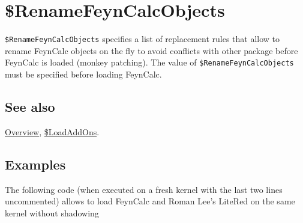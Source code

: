 \documentclass[../FeynCalcManual.tex]{subfiles}
\begin{document}
\hypertarget{dollarrenamefeyncalcobjects}{
\section{\$RenameFeynCalcObjects}\label{dollarrenamefeyncalcobjects}}

\texttt{\$RenameFeynCalcObjects} specifies a list of replacement rules
that allow to rename FeynCalc objects on the fly to avoid conflicts with
other package before FeynCalc is loaded (monkey patching). The value of
\texttt{\$RenameFeynCalcObjects} must be specified before loading
FeynCalc.

\subsection{See also}

\hyperlink{toc}{Overview}, \hyperlink{dollarloadaddons}{\$LoadAddOns}.

\subsection{Examples}

The following code (when executed on a fresh kernel with the last two
lines uncommented) allows to load FeynCalc and Roman Lee's LiteRed on
the same kernel without shadowing

\begin{Shaded}
\begin{Highlighting}[]
\ExtensionTok{=} \OperatorTok{\{} \OtherTok{{-}\textgreater{}} \OperatorTok{,}  \OtherTok{{-}\textgreater{}} \OperatorTok{,}  \OtherTok{{-}\textgreater{}} \OperatorTok{\}}\NormalTok{;}
\CommentTok{(*}
\CommentTok{*)}
\end{Highlighting}
\end{Shaded}
\end{document}
